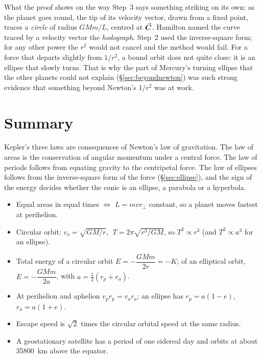 \begin{remarkbox}{What the proof shows on the way}
Step~3 says something striking on its own: as the planet goes round, the tip of its velocity vector,
drawn from a fixed point, traces a \emph{circle} of radius $GMm/L$, centred at $\vec{\bm{C}}$. Hamilton named
the curve traced by a velocity vector the \emph{hodograph}. Step~2 used the inverse-square form; for any
other power the $r^2$ would not cancel and the method would fail. For a force that departs slightly from
$1/r^2$, a bound orbit does not quite close: it is an ellipse that slowly turns. That is why the part of
Mercury's turning ellipse that the other planets could not explain (\S\ref{sec:beyondnewton}) was such
strong evidence that something beyond Newton's $1/r^2$ was at work.
\end{remarkbox}

\section{Summary}\label{sec:summary17}
Kepler's three laws are consequences of Newton's law of gravitation. The law of areas is the conservation of
angular momentum under a central force. The law of periods follows from equating gravity to the centripetal
force. The law of ellipses follows from the inverse-square form of the force (\S\ref{sec:ellipse}), and
the sign of the energy decides whether the conic is an ellipse, a parabola or a hyperbola.

\begin{itemize}
\item Equal areas in equal times $\Leftrightarrow$ $L=mvr_\perp$ constant, so a planet moves fastest at
      perihelion.
\item Circular orbit: $v_o=\sqrt{GM/r}$, $\;T=2\pi\sqrt{r^3/GM}$, so $T^2\propto r^3$ (and
      $T^2\propto a^3$ for an ellipse).
\item Total energy of a circular orbit $E=-\dfrac{GMm}{2r}=-K$; of an elliptical orbit,
      $E=-\dfrac{GMm}{2a}$, with $a=\tfrac12(r_p+r_a)$.
\item At perihelion and aphelion $v_pr_p=v_ar_a$; an ellipse has $r_p=a(1-e)$, $r_a=a(1+e)$.
\item Escape speed is $\sqrt2$ times the circular orbital speed at the same radius.
\item A geostationary satellite has a period of one sidereal day and orbits at about \SI{35800}{km} above the
      equator.
\end{itemize}

